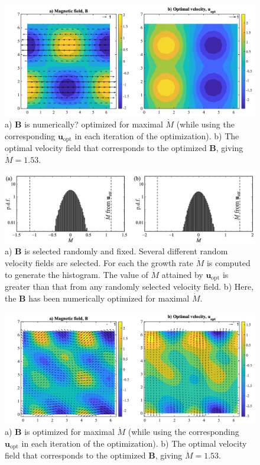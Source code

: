 \documentclass[onecolumn,showpacs,preprintnumbers,amsmath,amssymb]{revtex4-2}
\newcommand{\nick}[1]{{\color{orange}#1}}
\newcommand{\bvec}[1]{{\mathbf{#1}}}
\newcommand{\uu}{\bvec{u}}
\newcommand{\uopt}{\uu_{\text{opt}}}
\newcommand{\Bvec}{\bvec{B}}
\begin{document}
\begin{figure}[htb]
\centering
 \includegraphics[width=.99 \linewidth]{vfields_opt_K=1.png}
 \caption{
a) $\Bvec$ is \nick{numerically?} optimized for maximal $\dot{M}$ (while using the corresponding $\uopt$ in each iteration of the optimization).
b) The optimal velocity field that corresponds to the optimized $\Bvec$, giving $\dot{M} = 1.53$.}
\label{vfields_opt_K=1}
\end{figure}

\begin{figure}[htb]
\centering
 \includegraphics[width=.99 \linewidth]{histograms.png}
 \caption{
a) $\Bvec$ is selected randomly and fixed. Several different random velocity fields are selected. For each the growth rate $\dot{M}$ is computed to generate the histogram. The value of $\dot{M}$ attained by $\uopt$ is greater than that from any randomly selected velocity field.
b) Here, the $\Bvec$ has been numerically optimized for maximal $\dot{M}$.}
\label{histograms}
\end{figure}





\begin{figure}[htb]
\centering
 \includegraphics[width=.99 \linewidth]{vfields_opt_K=2.png}
 \caption{
a) $\Bvec$ is optimized for maximal $\dot{M}$ (while using the corresponding $\uopt$ in each iteration of the optimization).
b) The optimal velocity field that corresponds to the optimized $\Bvec$, giving $\dot{M} = 1.53$.}
\label{vfields_opt_K=2}
\end{figure}





\end{document}
